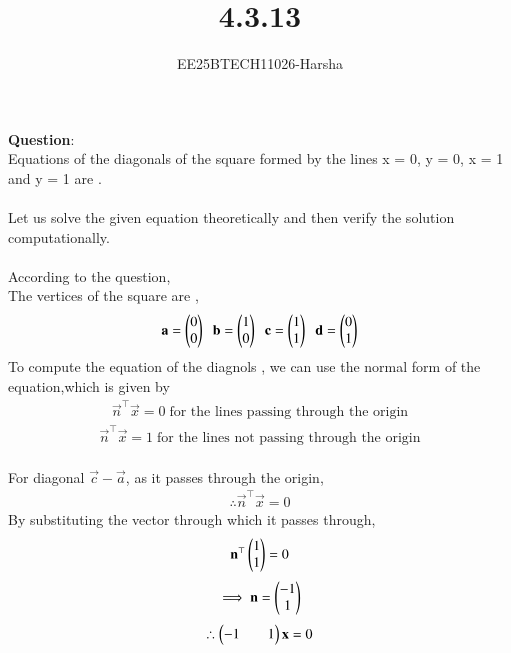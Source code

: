 \documentclass[journal]{IEEEtran}
\begin{document}

\vspace{3cm}

\title{4.3.13}
\author{EE25BTECH11026-Harsha}
 \maketitle
{\let\newpage\relax\maketitle}

\renewcommand{\thefigure}{\theenumi}
\renewcommand{\thetable}{\theenumi}
\setlength{\intextsep}{10pt} %


\renewcommand{\thetable}{\theenumi}

\textbf{Question}:\\
Equations of the diagonals of the square formed by the lines x = 0, y = 0, x = 1 and y = 1 are \underline{\hspace{2cm}}.\\
\solution \\
Let us solve the given equation theoretically and then verify the solution computationally.\\
\\
According to the question,\\
The vertices of the square are ,
\begin{align}
    \mathbf{a}=\begin{pmatrix}0\\0\end{pmatrix}\;\;\mathbf{b}=\begin{pmatrix}1\\0\end{pmatrix}\;\;\mathbf{c}=\begin{pmatrix}1\\1\end{pmatrix}\;\;\mathbf{d}=\begin{pmatrix}0\\1\end{pmatrix}
\end{align}
To compute the equation of the diagnols , we can use the normal form of the equation,which is given by
\begin{align}
    \vec{n}^{\top}\vec{x}=0\; \text{for the lines passing through the origin}
\end{align}
\begin{align}
    \vec{n}^{\top}\vec{x}=1 \;\text{for the lines not passing through the origin}
\end{align}
\\
For diagonal $\vec{c}-\vec{a}$, as it passes through the origin,
\begin{align}
    \therefore \vec{n}^{\top}\vec{x}=0
\end{align}
By substituting the vector through which it passes through,
\begin{align}
    \mathbf{n}^{\top}\begin{pmatrix}1\\1\end{pmatrix}=0
\end{align}
\begin{align}
    \implies \mathbf{n}=\begin{pmatrix}-1\\1\end{pmatrix}
\end{align}
\begin{align}
    \therefore \begin{pmatrix}-1&&1\end{pmatrix}\mathbf{x}=0
\end{align}
\newpage
\vspace*{0.25cm}
\end{document}
